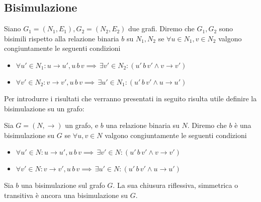 \subsection{Bisimulazione}
\begin{definition}
    Siano $G_1 = (N_1, E_1), G_2 = (N_2, E_2)$ due grafi. Diremo che $G_1, G_2$ sono bisimili \cite{dovier} rispetto alla relazione binaria $b$ su $N_1, N_2$ se $\forall u \in N_1, v \in N_2$ valgono congiuntamente le seguenti condizioni
    \begin{itemize}
        \item $\forall u' \in N_1 : u \to u', u \,b\, v \implies \,\exists v' \in N_2 : (u' \,b\, v' \land v \to v')$
        \item $\forall v' \in N_2 : v \to v', u \,b\, v \implies \,\exists u' \in N_1 : (u' \,b\, v' \land u \to u')$
    \end{itemize}
\end{definition}
Per introdurre i risultati che verranno presentati in seguito risulta utile definire la bisimulazione su un grafo:
\begin{definition}
    Sia $G = (N, \to)$ un grafo, e $b$ una relazione binaria su $N$. Diremo che $b$ è una bisimulazione su $G$ se $\forall u,v \in N$ valgono congiuntamente le seguenti condizioni
    \begin{itemize}
        \item $\forall u' \in N : u \to u', u \,b\, v \implies \,\exists v' \in N : (u' \,b\, v' \land v \to v')$
        \item $\forall v' \in N : v \to v', u \,b\, v \implies \,\exists u' \in N : (u' \,b\, v' \land u \to u')$
    \end{itemize}
\end{definition}
\begin{proposition}
    Sia $b$ una bisimulazione sul grafo $G$. La sua chiusura riflessiva, simmetrica o transitiva è ancora una bisimulazione su $G$.
\end{proposition}

